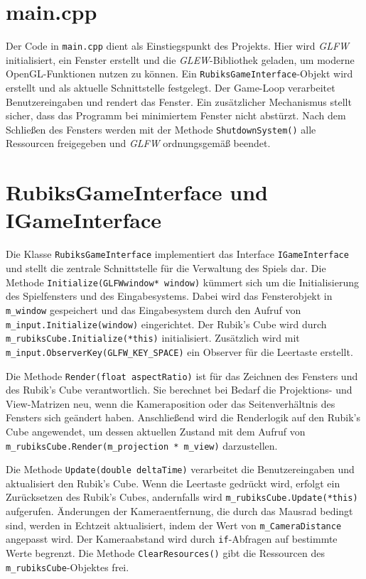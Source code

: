 \section{main.cpp}
Der Code in \texttt{main.cpp} dient als Einstiegspunkt des Projekts. Hier wird \textit{GLFW} initialisiert, ein Fenster erstellt und die \textit{GLEW}-Bibliothek geladen, um moderne OpenGL-Funktionen nutzen zu können. Ein \texttt{RubiksGameInterface}-Objekt wird erstellt und als aktuelle Schnittstelle festgelegt. Der Game-Loop verarbeitet Benutzereingaben und rendert das Fenster. Ein zusätzlicher Mechanismus stellt sicher, dass das Programm bei minimiertem Fenster nicht abstürzt. Nach dem Schließen des Fensters werden mit der Methode \texttt{ShutdownSystem()} alle Ressourcen freigegeben und \textit{GLFW} ordnungsgemäß beendet.


\section{RubiksGameInterface und IGameInterface}
Die Klasse \texttt{RubiksGameInterface} implementiert das Interface \texttt{IGameInterface} und stellt die zentrale Schnittstelle für die Verwaltung des Spiels dar.
Die Methode \texttt{Initialize(GLFWwindow* window)} kümmert sich um die Initialisierung des Spielfensters und des Eingabesystems. Dabei wird das Fensterobjekt in \texttt{m\_window} gespeichert und das Eingabesystem durch den Aufruf von \texttt{m\_input.Initialize(window)} eingerichtet. Der Rubik's Cube wird durch \texttt{m\_rubiksCube.Initialize(*this)} initialisiert. Zusätzlich wird mit \texttt{m\_input.ObserverKey(GLFW\_KEY\_SPACE)} ein Observer für die Leertaste erstellt.

Die Methode \texttt{Render(float aspectRatio)} ist für das Zeichnen des Fensters und des Rubik's Cube verantwortlich. Sie berechnet bei Bedarf die Projektions- und View-Matrizen neu, wenn die Kameraposition oder das Seitenverhältnis des Fensters sich geändert haben. Anschließend wird die Renderlogik auf den Rubik's Cube angewendet, um dessen aktuellen Zustand mit dem Aufruf von \texttt{m\_rubiksCube.Render(m\_projection * m\_view)} darzustellen.

Die Methode \texttt{Update(double deltaTime)} verarbeitet die Benutzereingaben und aktualisiert den Rubik's Cube. Wenn die Leertaste gedrückt wird, erfolgt ein Zurücksetzen des Rubik's Cubes, andernfalls wird \texttt{m\_rubiksCube.Update(*this)} aufgerufen. Änderungen der Kameraentfernung, die durch das Mausrad bedingt sind, werden in Echtzeit aktualisiert, indem der Wert von \texttt{m\_CameraDistance} angepasst wird. Der Kameraabstand wird durch \texttt{if}-Abfragen auf bestimmte Werte begrenzt. Die Methode \texttt{ClearResources()} gibt die Ressourcen des \texttt{m\_rubiksCube}-Objektes frei.

